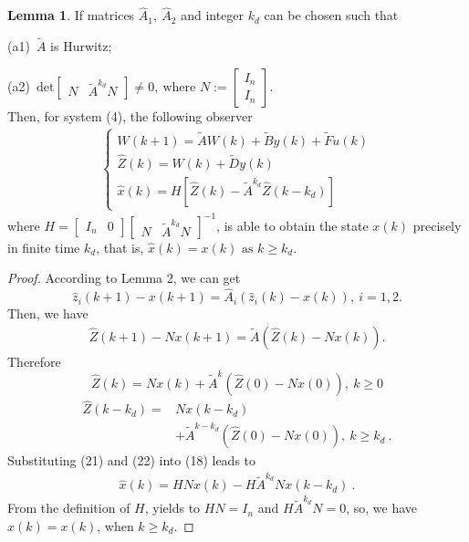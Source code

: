 \documentclass[english]{cccconf}
\theoremstyle{definition}
\newtheorem{lemma}{Lemma}
\begin{document}
\begin{lemma} If matrices $\hat{A}_1,\ \hat{A}_2$ and integer $k_d$ can be chosen such that 

(a1)\ $\tilde{A}$ is Hurwitz;

(a2)\ $\mathrm{det} \begin{bmatrix}
N&\tilde{A}^{k_d}N
\end{bmatrix}\neq 0,\ \text{where } N:=\begin{bmatrix}
I_n\\I_n
\end{bmatrix} $.\\
Then, for system (4), the following observer
\begin{equation}\begin{split}\begin{cases}
W(k+1)=\tilde{A}W(k)+\tilde{B}y(k)+\tilde{F}u(k)\\
\hat{Z}(k)=W(k)+\tilde{D}y(k)\\
\hat{x}(k)=H[\hat{Z}(k)-\tilde{A}^{k_d}\hat{Z}(k-k_d)]
\end{cases}\end{split}\end{equation}
where $H=\begin{bmatrix}
I_n&0
\end{bmatrix}\begin{bmatrix}
N&\tilde{A}^{k_d}N
\end{bmatrix}^{-1}$, is able to obtain the state $x(k)$ precisely in finite time $k_d$, that is, $\hat{x}(k)= x(k)\text{ as }k\geq k_d$.
\begin{proof}
According to Lemma 2, we can get
\begin{equation}
\hat{z}_i(k+1)-x(k+1)=\hat{A}_i(\hat{z}_i(k)-x(k)),\ i=1,2.
\end{equation}
Then, we have
\begin{equation}\begin{split}
\hat{Z}(k+1)-Nx(k+1)=\tilde{A}(\hat{Z}(k)-Nx(k)).
\end{split}\end{equation}
Therefore
\begin{equation}
\hat{Z}(k)=Nx(k)+\tilde{A}^k(\hat{Z}(0)-Nx(0)),\ k\geq 0
\end{equation}
\begin{equation}\begin{split}
\hat{Z}(k-k_d)=&Nx(k-k_d)\\&+\tilde{A}^{k-k_d}(\hat{Z}(0)-Nx(0)),\ k\geq k_d\ .
\end{split}\end{equation}
Substituting (21) and (22) into (18) leads to
\begin{equation}\begin{split}
\hat{x}(k)=HNx(k)-H\tilde{A}^{k_d}Nx(k-k_d)\ .
\end{split}\end{equation}
From the definition of $H$, yields to $HN=I_n$ and $H\tilde{A}^{k_d}N=0$, so, we have $\hat{x}(k)=x(k)$, when $k\geq k_d$.
\end{proof}
\end{lemma}
\end{document}
